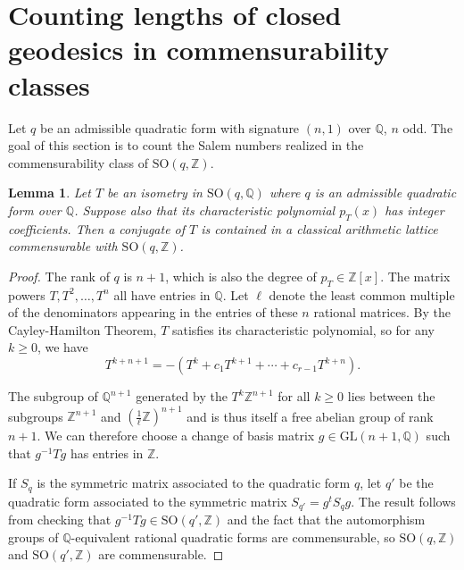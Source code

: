 \documentclass[12pt]{amsart}
\newcommand{\SO}{\mathrm{SO}}
\newcommand{\Q}{\mathbb{Q}}
\newcommand{\Z}{\mathbb{Z}}
\newcommand{\GL}{\mathrm{GL}}
\theoremstyle{plain}
\newtheorem{lemma}[theorem]{Lemma}
\begin{document}
\section{Counting lengths of closed geodesics in commensurability classes}\label{s:count lengths}
Let $q$ be an admissible quadratic form with signature $(n,1)$ over $\Q$, $n$ odd. The goal of this section is to count the Salem numbers realized in the commensurability class of $\SO(q,\Z)$. 


\begin{lemma}\label{lem:QtoZ}
    Let $T$ be an isometry in $\SO(q,\Q)$ where $q$ is an admissible quadratic form over $\Q$. Suppose also that its characteristic polynomial $p_T(x)$ has integer coefficients. Then a conjugate of $T$ is contained in a classical arithmetic lattice commensurable with $\SO(q,\Z)$.
\end{lemma}

\begin{proof}
    The rank of $q$ is $n+1$, which is also the degree of $p_T\in\Z[x]$. The matrix powers $T,T^2,\dots,T^{n}$ all have entries in $\Q$. Let $\ell$ denote the least common multiple of the denominators appearing in the entries of these $n$ rational matrices.
    By the Cayley-Hamilton Theorem, $T$ satisfies its characteristic polynomial, so for any $k\geq 0$, we have 
    \[ T^{k+n+1}=-\left( T^k +c_1 T^{k+1}+\cdots +c_{r-1}T^{k+n} \right) . \]
    
    The subgroup of $\Q^{n+1}$ generated by the $T^k\Z^{n+1}$ for all $k\geq 0$ lies between the subgroups $\Z^{n+1}$ and $(\frac{1}{\ell}\Z)^{n+1}$ and is thus itself a free abelian group of rank $n+1$. We can therefore choose a change of basis matrix $g\in\GL(n+1,\Q)$ such that $g^{-1}Tg$ has entries in $\Z$.
    
    If $S_q$ is the symmetric matrix associated to the quadratic form $q$, let $q'$ be the quadratic form associated to the symmetric matrix $S_{q'}=g^t S_q g$. The result follows from checking that $g^{-1} T g\in \SO(q',\Z)$ and the fact that the automorphism groups of $\Q$-equivalent rational quadratic forms are commensurable, so $\SO(q,\Z)$ and $\SO(q',\Z)$ are commensurable.
\end{proof}
\end{document}
